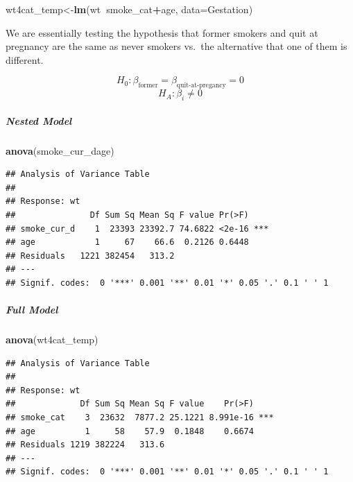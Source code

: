 \documentclass[]{article}
\newenvironment{Shaded}{\begin{snugshade}}{\end{snugshade}}
\newcommand{\DataTypeTok}[1]{\textcolor[rgb]{0.13,0.29,0.53}{#1}}
\newcommand{\KeywordTok}[1]{\textcolor[rgb]{0.13,0.29,0.53}{\textbf{#1}}}
\newcommand{\NormalTok}[1]{#1}
\newcommand{\OperatorTok}[1]{\textcolor[rgb]{0.81,0.36,0.00}{\textbf{#1}}}
\let\oldsubparagraph\subparagraph
\renewcommand{\subparagraph}[1]{\oldsubparagraph{#1}\mbox{}}
\begin{document}
\begin{Shaded}
\begin{Highlighting}[]
\NormalTok{wt4cat_temp<-}\KeywordTok{lm}\NormalTok{(wt}\OperatorTok{~}\NormalTok{smoke_cat}\OperatorTok{+}\NormalTok{age, }\DataTypeTok{data=}\NormalTok{Gestation)}
\end{Highlighting}
\end{Shaded}

\newpage

We are essentially testing the hypothesis that former smokers and quit
at pregnancy are the same as never smokers vs.~the alternative that one
of them is different.

\[H_0: \beta_\text{former} = \beta_\text{quit-at-pregancy} = 0 \]
\[H_A: \beta_i \neq 0 \]

\hypertarget{nested-model}{%
\subparagraph{Nested Model}\label{nested-model}}

\begin{Shaded}
\begin{Highlighting}[]
\KeywordTok{anova}\NormalTok{(smoke_cur_dage)}
\end{Highlighting}
\end{Shaded}

\begin{verbatim}
## Analysis of Variance Table
## 
## Response: wt
##               Df Sum Sq Mean Sq F value Pr(>F)    
## smoke_cur_d    1  23393 23392.7 74.6822 <2e-16 ***
## age            1     67    66.6  0.2126 0.6448    
## Residuals   1221 382454   313.2                   
## ---
## Signif. codes:  0 '***' 0.001 '**' 0.01 '*' 0.05 '.' 0.1 ' ' 1
\end{verbatim}

\hypertarget{full-model}{%
\subparagraph{Full Model}\label{full-model}}

\begin{Shaded}
\begin{Highlighting}[]
\KeywordTok{anova}\NormalTok{(wt4cat_temp)}
\end{Highlighting}
\end{Shaded}

\begin{verbatim}
## Analysis of Variance Table
## 
## Response: wt
##             Df Sum Sq Mean Sq F value    Pr(>F)    
## smoke_cat    3  23632  7877.2 25.1221 8.991e-16 ***
## age          1     58    57.9  0.1848    0.6674    
## Residuals 1219 382224   313.6                      
## ---
## Signif. codes:  0 '***' 0.001 '**' 0.01 '*' 0.05 '.' 0.1 ' ' 1
\end{verbatim}
\end{document}
